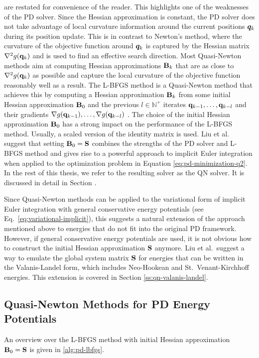 \noindent are restated for convenience of the reader. This highlights one of the weaknesses of the PD solver. Since the Hessian approximation 
is constant, the PD solver does not take advantage of local curvature information around the current positions $\bm{q}_k$ during its position 
update. This is in contrast to Newton's method, where the curvature of the objective function around $\bm{q}_k$ is captured by the Hessian 
matrix $\nabla^2 g(\mathbf{q}_k)$ and is used to find an effective search direction. Most Quasi-Newton methods aim at computing Hessian 
approximations $\mathbf{B}_k$ that are as close to $\nabla^2 g(\mathbf{q}_k)$ as possible and capture the local curvature of the objective function 
reasonably well as a result. The L-BFGS method is a Quasi-Newton method that achieves this by computing a Hessian approximation $\mathbf{B}_k$ 
from some initial Hessian approximation $\mathbf{B}_0$ and the previous $l \in \mathbb{N}^+$ iterates $\mathbf{q}_{k-1}, \ldots, \mathbf{q}_{k-l}$ 
and their gradients $\nabla g(\mathbf{q}_{k-1}), \ldots, \nabla g(\mathbf{q}_{k-l})$ \cite{nocedal2006}. The choice of the initial Hessian 
approximation $\mathbf{B}_0$ has a strong impact on the performance of the L-BFGS method. Usually, a scaled version of the identity matrix is 
used. Liu et al.\ \cite{liu2017} suggest that setting $\mathbf{B}_0 = \mathbf{S}$ combines the strengths of the PD solver and L-BFGS method 
and gives rise to a powerful approach to implicit Euler integration when applied to the optimization problem in Equation \ref{eq:pd-minimization-q2}.
In the rest of this thesis, we refer to the resulting solver as the QN solver. It is discussed in detail in Section .

Since Quasi-Newton methods can be applied to the variational form of implicit Euler integration with general conservative energy potentials 
(see Eq.\ \ref{eq:variational-implicit}), this suggests a natural extension of the approach mentioned above to energies that do not fit into 
the original PD framework. However, if general conservative energy potentials are used, it is not obvious how to construct the initial Hessian 
approximation $\mathbf{S}$ anymore. Liu et al.\ suggest a way to emulate the global system matrix $\mathbf{S}$ for energies that can be written in
the Valanis-Landel form, which includes Neo-Hookean and St.\ Venant-Kirchhoff energies. This extension is covered in 
Section \ref{ss:qn-valanis-landel}. 

\subsection{Quasi-Newton Methods for PD Energy Potentials}\label{ss:qn-pd}
An overview over the L-BFGS method with initial Hessian approximation $\mathbf{B}_0 = \mathbf{S}$ is given in \autoref{alg:pd-lbfgs}.

